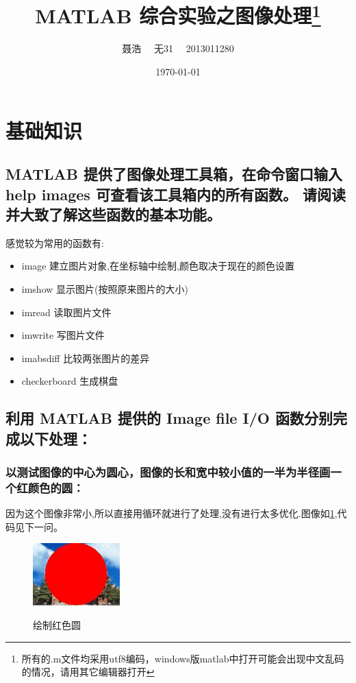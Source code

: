 \documentclass{ctexart}
\title{MATLAB 综合实验之图像处理\footnote{所有的.m文件均采用utf8编码，windows版matlab中打开可能会出现中文乱码的情况，请用其它编辑器打开}}
\author{聂浩~~ 无31~~ 2013011280}
\date{\today}
\begin{document}
\maketitle
\section{基础知识}
\subsection{
MATLAB 提供了图像处理工具箱，在命令窗口输入 help images 可查看该工具箱内的所有函数。 请阅读并大致了解这些函数的基本功能。}

感觉较为常用的函数有:
\begin{itemize}
    \item{image 建立图片对象,在坐标轴中绘制,颜色取决于现在的颜色设置}
    \item{imshow 显示图片(按照原来图片的大小)}
    \item{imread 读取图片文件}
    \item{imwrite 写图片文件}
    \item{imabsdiff 比较两张图片的差异}
    \item{checkerboard 生成棋盘}
\end{itemize}

\subsection{
利用 MATLAB 提供的 Image file I/O 函数分别完成以下处理：}
\subsubsection{以测试图像的中心为圆心，图像的长和宽中较小值的一半为半径画一个红颜色的圆：}
因为这个图像非常小,所以直接用循环就进行了处理,没有进行太多优化.图像如\ref{1circle},代码见下一问。
\begin{figure}
    \centering
    \includegraphics[width=0.3\textwidth]{circle.jpg}\\
    \caption{绘制红色圆\label{1circle}}
\end{figure}
\end{document}
